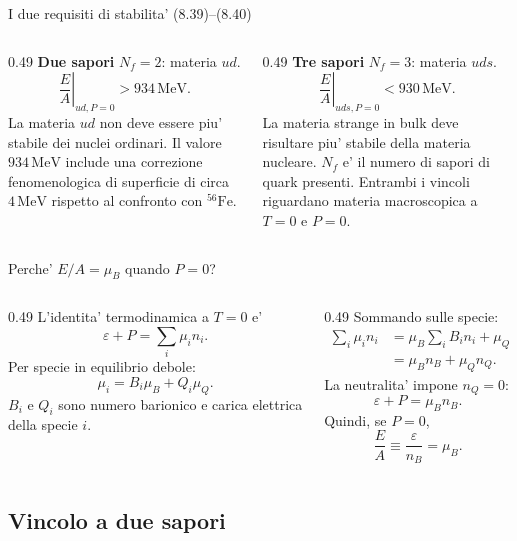 \begin{frame}{I due requisiti di stabilita' (8.39)--(8.40)}
\small
\begin{columns}[T,onlytextwidth]
\begin{column}{0.49\textwidth}
\textbf{Due sapori} $N_f=2$: materia $ud$.
\[
\left.\frac EA\right|_{ud,P=0}
>934\,\mathrm{MeV}.
\]
La materia $ud$ non deve essere
piu' stabile dei nuclei ordinari.
\medskip
Il valore $934\,\mathrm{MeV}$ include
una correzione fenomenologica di
superficie di circa $4\,\mathrm{MeV}$
rispetto al confronto con $^{56}\mathrm{Fe}$.
\end{column}
\begin{column}{0.49\textwidth}
\textbf{Tre sapori} $N_f=3$: materia $uds$.
\[
\left.\frac EA\right|_{uds,P=0}
<930\,\mathrm{MeV}.
\]
La materia strange in bulk deve risultare
piu' stabile della materia nucleare.
\medskip
$N_f$ e' il numero di sapori di quark
presenti. Entrambi i vincoli riguardano
materia macroscopica a $T=0$ e $P=0$.
\end{column}
\end{columns}
\end{frame}

\begin{frame}{Perche' $E/A=\mu_B$ quando $P=0$?}
\small
\begin{columns}[T,onlytextwidth]
\begin{column}{0.49\textwidth}
L'identita' termodinamica a $T=0$ e'
\[
\varepsilon+P=\sum_i\mu_i n_i.
\]
Per specie in equilibrio debole:
\[
\mu_i=B_i\mu_B+Q_i\mu_Q.
\]
$B_i$ e $Q_i$ sono numero barionico
e carica elettrica della specie $i$.
\end{column}
\begin{column}{0.49\textwidth}
Sommando sulle specie:
\begin{align*}
\sum_i\mu_i n_i
&=\mu_B\sum_iB_i n_i
+\mu_Q\sum_iQ_i n_i\\
&=\mu_Bn_B+\mu_Qn_Q.
\end{align*}
La neutralita' impone $n_Q=0$:
\[
\varepsilon+P=\mu_Bn_B.
\]
Quindi, se $P=0$,
\[
\frac EA\equiv\frac\varepsilon{n_B}=\mu_B.
\]
\end{column}
\end{columns}
\end{frame}

\subsection{Vincolo a due sapori}

